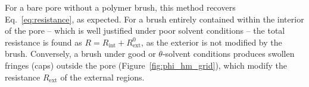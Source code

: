 \documentclass[12pt, a4paper]{article}
\begin{document}




For a bare pore without a polymer brush, this method recovers Eq.~\ref{eq:resistance}, as expected.
For a brush entirely contained within the interior of the pore -- which is well justified under poor solvent conditions -- the total resistance is found as $R = R_{\text{int}} + R_{\text{ext}}^{0}$, as the exterior is not modified by the brush.
Conversely, a brush under good or $\theta$-solvent conditions produces swollen fringes (caps) outside the pore (Figure~\ref{fig:phi_hm_grid}), which modify the resistance $R_{\text{ext}}$ of the external regions.
\end{document}
